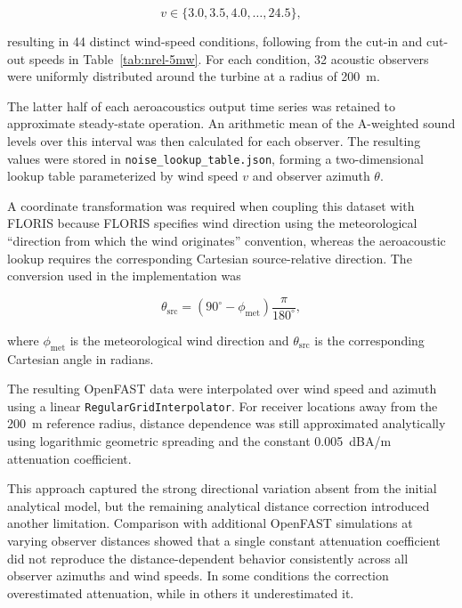 \documentclass[11pt]{article}
\begin{document}
\begin{equation}
    v \in \{3.0, 3.5, 4.0, \ldots, 24.5\},
    \label{eq:v_range}
\end{equation}

resulting in 44 distinct wind-speed conditions, following from the cut-in and cut-out speeds in Table~\ref{tab:nrel-5mw}. For each condition, 32 acoustic observers were uniformly distributed around the turbine at a radius of 200~m.

The latter half of each aeroacoustics output time series was retained to approximate steady-state operation. An arithmetic mean of the A-weighted sound levels over this interval was then calculated for each observer. The resulting values were stored in \texttt{noise\_lookup\_table.json}, forming a two-dimensional lookup table parameterized by wind speed $v$ and observer azimuth $\theta$.

A coordinate transformation was required when coupling this dataset with FLORIS because FLORIS specifies wind direction using the meteorological ``direction from which the wind originates'' convention, whereas the aeroacoustic lookup requires the corresponding Cartesian source-relative direction. The conversion used in the implementation was

\begin{equation}
    \theta_{\mathrm{src}}
    =
    \left(90^\circ-\phi_{\mathrm{met}}\right)
    \frac{\pi}{180^\circ},
    \label{eq:wind-direction-conversion}
\end{equation}

where $\phi_{\mathrm{met}}$ is the meteorological wind direction and $\theta_{\mathrm{src}}$ is the corresponding Cartesian angle in radians.

The resulting OpenFAST data were interpolated over wind speed and azimuth using a linear \texttt{RegularGridInterpolator}. For receiver locations away from the 200~m reference radius, distance dependence was still approximated analytically using logarithmic geometric spreading and the constant 0.005~dBA/m attenuation coefficient.

This approach captured the strong directional variation absent from the initial analytical model, but the remaining analytical distance correction introduced another limitation. Comparison with additional OpenFAST simulations at varying observer distances showed that a single constant attenuation coefficient did not reproduce the distance-dependent behavior consistently across all observer azimuths and wind speeds. In some conditions the correction overestimated attenuation, while in others it underestimated it.
\end{document}
